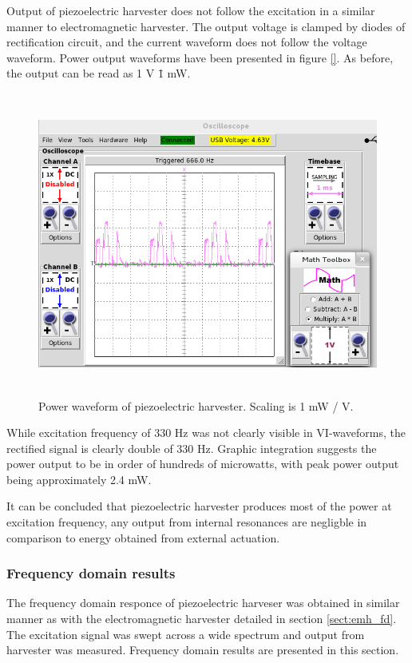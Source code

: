 Output of piezoelectric harvester does not follow the excitation in a similar manner to electromagnetic harvester. The output voltage is clamped by diodes of rectification circuit, and the current waveform does not follow the voltage waveform. Power output waveforms have been presented in figure \ref{}. As before, the output can be read as 1 V \= 1 mW. 

\begin{figure}[htb]
\begin{center}
\includegraphics[height=10cm]{images/own_measurement/generator_shaker/piezo_td_power_330hz_2_3.png}
\end{center}
\caption{\label{fig:piezo_td_vi} Power waveform of piezoelectric harvester. Scaling is 1 mW / V.}
\end{figure}

While excitation frequency of 330 Hz was not clearly visible in VI-waveforms, the rectified signal is clearly double of 330 Hz. Graphic integration suggests the power output to be in order of hundreds of microwatts, with peak power output being approximately 2.4 mW. 

It can be concluded that piezoelectric harvester produces most of the power at excitation frequency, any output from internal resonances are negligble in comparison to energy obtained from external actuation.

\subsubsection{Frequency domain results} \label{sect:piezo_fd}
The frequency domain responce of piezoelectric harveser was obtained in similar manner as with the electromagnetic harvester detailed in section \ref{sect:emh_fd}. The excitation signal was swept across a wide spectrum and output from harvester was measured. Frequency domain results are presented in this section.


